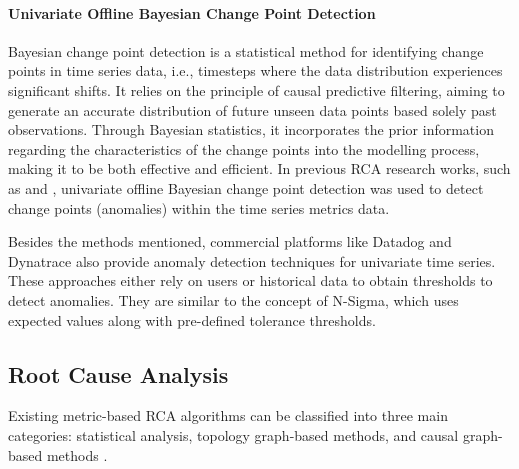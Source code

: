 \vspace{-0.2cm}
\paragraph{Univariate Offline Bayesian Change Point Detection}
Bayesian change point detection \cite{adams2007bayesian} is a statistical method for identifying change points in time series data, i.e., timesteps where the data distribution experiences significant shifts. It relies on the principle of causal predictive filtering, aiming to generate an accurate distribution of future unseen data points based solely past observations. Through Bayesian statistics, it incorporates the prior information regarding the characteristics of the change points into the modelling process, making it to be both effective and efficient. In previous RCA research works, such as \cite{Chen2014Causeinfer} and \cite{chen2016causeinfer}, univariate offline Bayesian change point detection was used to detect change points (anomalies) within the time series metrics data. 

Besides the methods mentioned, commercial platforms like Datadog \cite{datadog} and Dynatrace \cite{dynatrace} also provide anomaly detection techniques \cite{datadog2, dynatrace1} for univariate time series. These approaches either rely on users or historical data to obtain thresholds to detect anomalies. They are similar to the concept of N-Sigma, which uses expected values along with pre-defined tolerance thresholds.



\subsection{Root Cause Analysis}

Existing metric-based RCA algorithms can be classified into three main categories: statistical analysis, topology graph-based methods, and causal graph-based methods \cite{Soldani2022rcasurvey}.

\vspace{-0.2cm}
